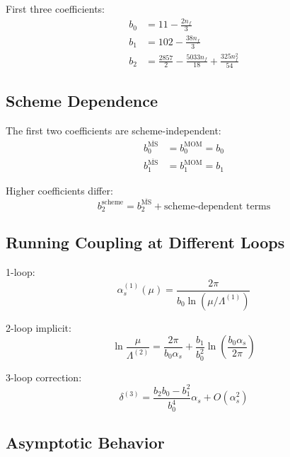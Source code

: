 \documentclass[11pt,a4paper]{article}
\theoremstyle{definition}
\begin{document}
First three coefficients:
\begin{align}
\label{eq:app-b0-full}
b_0 &= 11 - \frac{2n_f}{3} \\
\label{eq:app-b1-full}
b_1 &= 102 - \frac{38n_f}{3} \\
\label{eq:app-b2-full}
b_2 &= \frac{2857}{2} - \frac{5033n_f}{18} + \frac{325n_f^2}{54}
\end{align}

\subsection{Scheme Dependence}
\label{subsec:scheme-dep}

The first two coefficients are scheme-independent:
\begin{align}
\label{eq:app-scheme-b0}
b_0^{\overline{\text{MS}}} &= b_0^{\text{MOM}} = b_0 \\
\label{eq:app-scheme-b1}
b_1^{\overline{\text{MS}}} &= b_1^{\text{MOM}} = b_1
\end{align}

Higher coefficients differ:
\begin{equation}
\label{eq:app-scheme-b2}
b_2^{\text{scheme}} = b_2^{\overline{\text{MS}}} + \text{scheme-dependent terms}
\end{equation}

\subsection{Running Coupling at Different Loops}
\label{subsec:running-loops}

1-loop:
\begin{equation}
\label{eq:app-run-1loop}
\alpha_s^{(1)}(\mu) = \frac{2\pi}{b_0\ln(\mu/\Lambda^{(1)})}
\end{equation}

2-loop implicit:
\begin{equation}
\label{eq:app-run-2loop}
\ln\frac{\mu}{\Lambda^{(2)}} = \frac{2\pi}{b_0\alpha_s}
  + \frac{b_1}{b_0^2}\ln\left(\frac{b_0\alpha_s}{2\pi}\right)
\end{equation}

3-loop correction:
\begin{equation}
\label{eq:app-run-3loop}
\delta^{(3)} = \frac{b_2 b_0 - b_1^2}{b_0^4}\alpha_s + O(\alpha_s^2)
\end{equation}

\subsection{Asymptotic Behavior}
\label{subsec:asymptotic}
\end{document}
